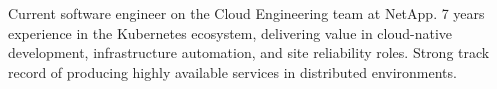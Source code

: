 

\begin{cvparagraph}

Current software engineer on the Cloud Engineering team at NetApp. 
7 years experience in the Kubernetes ecosystem, delivering value in cloud-native development, infrastructure automation, and site reliability roles. 
Strong track record of producing highly available services in distributed environments. 

\end{cvparagraph}
